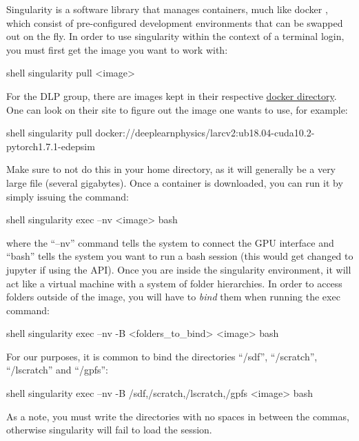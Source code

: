 \documentclass[8pt]{refart}
\begin{document}
 Singularity \cite{singularity,singularity-github} is a software library that manages containers, much like docker \cite{docker}, which consist of pre-configured development environments that can be swapped out on the fly.  In order to use singularity within the context of a terminal login, you must first get the image you want to work with:
\begin{code}{shell}
singularity pull <image>
\end{code}
For the DLP group, there are images kept in their respective \href{https://hub.docker.com/u/deeplearnphysics}{docker directory}.  One can look on their site to figure out the image one wants to use, for example:
\begin{code}{shell}
singularity pull docker://deeplearnphysics/larcv2:ub18.04-cuda10.2-pytorch1.7.1-edepsim
\end{code}
Make sure to not do this in your home directory, as it will generally be a very large file (several gigabytes).  Once a container is downloaded, you can run it by simply issuing the command:
\begin{code}{shell}
singularity exec --nv <image> bash
\end{code}
where the ``--nv'' command tells the system to connect the GPU interface and ``bash'' tells the system you want to run a bash session (this would get changed to jupyter if using the API).  Once you are inside the singularity environment, it will act like a virtual machine with a system of folder hierarchies.  In order to access folders outside of the image, you will have to \textit{bind} them when running the exec command:
\begin{code}{shell}
singularity exec --nv -B <folders_to_bind> <image> bash
\end{code}
For our purposes, it is common to bind the directories ``/sdf'', ``/scratch'', ``/lscratch'' and ``/gpfs'':
\begin{code}{shell}
singularity exec --nv -B /sdf,/scratch,/lscratch,/gpfs <image> bash
\end{code}
As a note, you must write the directories with no spaces in between the commas, otherwise singularity will fail to load the session.
\end{document}
